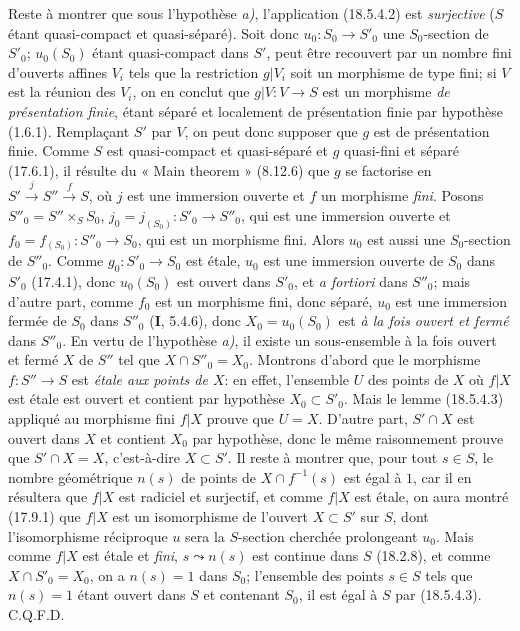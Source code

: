 Reste à montrer que sous l'hypothèse \emph{a)}, l'application (18.5.4.2) est \emph{surjective} ($S$ étant quasi-compact et quasi-séparé). Soit donc $u_0:S_0\to S'_0$ une $S_0$-section de $S'_0$; $u_0(S_0)$ étant quasi-compact dans $S'$, peut être recouvert par un nombre fini d'ouverts
affines $V_i$ tels que la restriction $g|V_i$ soit un morphisme de type fini; si $V$ est la réunion des $V_i$, on en conclut que $g|V:V\to S$ est un morphisme \emph{de présentation finie}, étant séparé et localement de présentation finie par hypothèse (1.6.1). Remplaçant $S'$ par $V$, on peut donc supposer que $g$ est de présentation finie. Comme $S$ est quasi-compact et quasi-séparé et $g$ quasi-fini et séparé (17.6.1), il résulte du « Main theorem » (8.12.6) que $g$ se factorise en $S'\xrightarrow{j}S''\xrightarrow{f}S$, où $j$ est une immersion ouverte et $f$ un morphisme \emph{fini}. Posons $S''_0=S''\times_S S_0$, $j_0=j_{(S_0)}:S'_0\to S''_0$, qui est une immersion ouverte et $f_0=f_{(S_0)}:S''_0\to S_0$, qui est un morphisme fini. Alors $u_0$ est aussi une $S_0$-section de $S''_0$. Comme $g_0:S'_0\to S_0$ est étale, $u_0$ est une immersion ouverte de $S_0$ dans $S'_0$ (17.4.1), donc $u_0(S_0)$ est ouvert dans $S'_0$, et \emph{a fortiori} dans $S''_0$; mais d'autre part, comme $f_0$ est un morphisme fini, donc séparé, $u_0$ est une immersion fermée de $S_0$ dans $S''_0$ (\textbf{I}, 5.4.6), donc $X_0=u_0(S_0)$ est \emph{à la fois ouvert et fermé} dans $S''_0$. En vertu de l'hypothèse \emph{a)}, il existe un sous-ensemble à la fois ouvert et fermé $X$ de $S''$ tel que $X\cap S''_0=X_0$. Montrons d'abord que le morphisme $f:S''\to S$ est \emph{étale aux points de $X$}: en effet, l'ensemble $U$ des points de $X$ où $f|X$ est étale est ouvert et contient par hypothèse $X_0\subset S'_0$. Mais le lemme (18.5.4.3) appliqué au morphisme fini $f|X$ prouve que $U=X$. D'autre part, $S'\cap X$ est ouvert dans $X$ et contient $X_0$ par hypothèse, donc le même raisonnement prouve que $S'\cap X=X$, c'est-à-dire $X\subset S'$. Il reste à montrer que, pour tout $s\in S$, le nombre géométrique $n(s)$ de points de $X\cap f^{-1}(s)$ est égal à $1$, car il en résultera que $f|X$ est radiciel et surjectif, et comme $f|X$ est étale, on aura montré (17.9.1) que $f|X$ est un isomorphisme de l'ouvert $X\subset S'$ sur $S$, dont l'isomorphisme réciproque $u$ sera la $S$-section cherchée prolongeant $u_0$. Mais comme $f|X$ est étale et \emph{fini}, $s\leadsto n(s)$ est continue dans $S$ (18.2.8), et comme $X\cap S'_0=X_0$, on a $n(s)=1$ dans $S_0$; l'ensemble des points $s\in S$ tels que $n(s)=1$ étant ouvert dans $S$ et contenant $S_0$, il est égal à $S$ par (18.5.4.3). C.Q.F.D.

